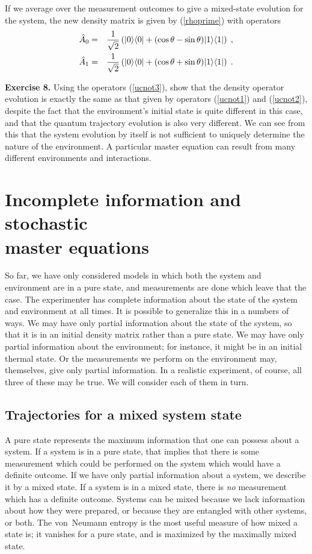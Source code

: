If we average over the measurement outcomes to give a mixed-state
evolution for the system, the new density matrix is given by
(\ref{rhoprime}) with operators
\begin{eqnarray}
{\hat A}_0 &=& {1\over\sqrt2} \left( {| 0 \rangle}{\langle 0 |}
  + (\cos\theta-\sin\theta) {| 1 \rangle}{\langle 1 |} \right) \;, \nonumber\\
{\hat A}_1 &=& {1\over\sqrt2} \left(  {| 0 \rangle}{\langle 0 |}
  + (\cos\theta+\sin\theta) {| 1 \rangle}{\langle 1 |} \right) \;.
\label{ucnot3}
\end{eqnarray}

\medskip\noindent
{\bf Exercise 8.}  Using the operators (\ref{ucnot3}), show that the
density operator evolution is exactly the same as that given by operators
(\ref{ucnot1}) and (\ref{ucnot2}), despite the fact that the environment's
initial state is quite different in this case, and that the quantum
trajectory evolution is also very different.  We can see from this that
the system evolution by itself is not sufficient to uniquely determine the
nature of the environment.  A particular master equation can result from
many different environments and interactions.
\medskip

\section{Incomplete information and stochastic \\ master equations}

So far, we have only considered models in which both the system and
environment are in a pure state, and measurements
are done which leave that the case.
The experimenter has complete information
about the state of the system and environment at all times.
It is possible to generalize this in a numbers of ways.  We may have only
partial information about the state of the system, so that it is in an
initial density matrix rather than a pure state.  We may have only partial
information about the environment; for instance, it might be in an initial
thermal state.  Or the measurements we perform on the environment may,
themselves, give only partial information.  In a realistic experiment,
of course, all three of these may be true.  We will consider each of
them in turn.

\subsection{Trajectories for a mixed system state}

A pure state represents the maximum information that one can possess about
a system.  If a system is in a pure state, that implies that there is
some measurement which could be performed on the system which would have
a definite outcome.  If we have only partial information about a system,
we describe it by a mixed state.  If a system is in a mixed state, there
is {\it no} measurement which has a definite outcome.  Systems can be
mixed because we lack information about how they were prepared, or because
they are entangled with other systems, or both.  The von~Neumann entropy
is the most useful measure of how mixed a state is; it vanishes for a
pure state, and is maximized by the maximally mixed state.


